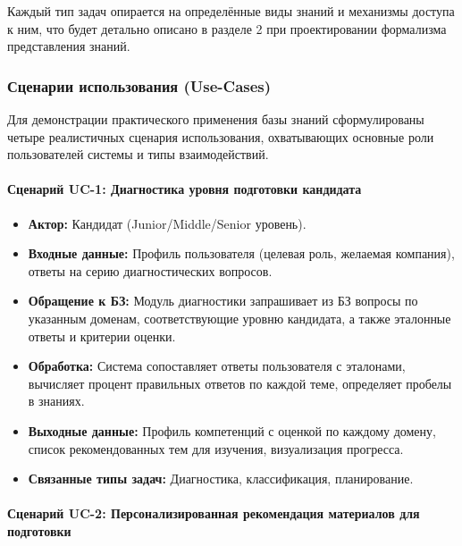 Каждый тип задач опирается на определённые виды знаний и механизмы доступа к ним, что будет детально описано в разделе 2 при проектировании формализма представления знаний.

\subsubsection*{Сценарии использования (Use-Cases)}

Для демонстрации практического применения базы знаний сформулированы четыре реалистичных сценария использования, охватывающих основные роли пользователей системы и типы взаимодействий.

\paragraph{Сценарий UC-1: Диагностика уровня подготовки кандидата}

\begin{itemize}
    \item \textbf{Актор:} Кандидат (Junior/Middle/Senior уровень).
    \item \textbf{Входные данные:} Профиль пользователя (целевая роль, желаемая компания), ответы на серию диагностических вопросов.
    \item \textbf{Обращение к БЗ:} Модуль диагностики запрашивает из БЗ вопросы по указанным доменам, соответствующие уровню кандидата, а также эталонные ответы и критерии оценки.
    \item \textbf{Обработка:} Система сопоставляет ответы пользователя с эталонами, вычисляет процент правильных ответов по каждой теме, определяет пробелы в знаниях.
    \item \textbf{Выходные данные:} Профиль компетенций с оценкой по каждому домену, список рекомендованных тем для изучения, визуализация прогресса.
    \item \textbf{Связанные типы задач:} Диагностика, классификация, планирование.
\end{itemize}

\paragraph{Сценарий UC-2: Персонализированная рекомендация материалов для подготовки}

